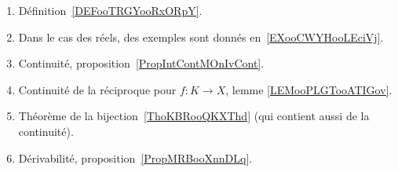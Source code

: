 
\begin{enumerate}
	\item
	      Définition~\ref{DEFooTRGYooRxORpY}.
	\item
	      Dans le cas des réels, des exemples sont donnés en~\ref{EXooCWYHooLEciVj}.
	\item
	      Continuité, proposition~\ref{PropIntContMOnIvCont}.
      \item
          Continuité de la réciproque pour \( f\colon K\to X\), lemme \ref{LEMooPLGTooATIGov}.
	\item
	      Théorème de la bijection~\ref{ThoKBRooQKXThd} (qui contient aussi de la continuité).
	\item
	      Dérivabilité, proposition~\ref{PropMRBooXnnDLq}.
\end{enumerate}

